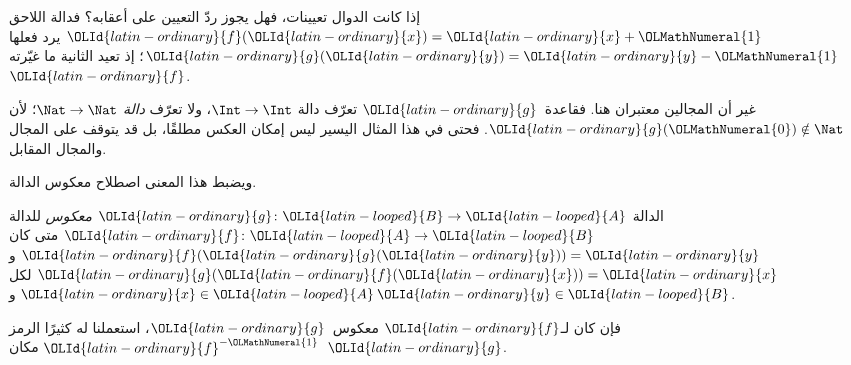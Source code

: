 \documentclass[../../../include/open-logic-section]{subfiles}
\begin{document}

\begin{explain}
إذا كانت الدوال تعيينات، فهل يجوز ردّ التعيين على أعقابه؟
فدالة اللاحق $\OLId{latin-ordinary}{f}(\OLId{latin-ordinary}{x}) = \OLId{latin-ordinary}{x} + \OLMathNumeral{1}$ يرد فعلها $\OLId{latin-ordinary}{g}(\OLId{latin-ordinary}{y}) = \OLId{latin-ordinary}{y} - \OLMathNumeral{1}$؛ إذ
تعيد الثانية ما غيّرته~$\OLId{latin-ordinary}{f}$.

غير أن المجالين معتبران هنا. فقاعدة~$\OLId{latin-ordinary}{g}$ تعرّف دالة
$\Int \to \Int$، ولا تعرّف \emph{دالة} $\Nat
\to \Nat$؛ لأن $\OLId{latin-ordinary}{g}(\OLMathNumeral{0}) \notin \Nat$. فحتى في هذا المثال اليسير
ليس إمكان العكس مطلقًا، بل قد يتوقف على المجال والمجال المقابل.

ويضبط هذا المعنى اصطلاح معكوس الدالة.
\end{explain}

\begin{defn}
الدالة $\OLId{latin-ordinary}{g} \colon \OLId{latin-looped}{B} \to \OLId{latin-looped}{A}$ \emph{معكوس} للدالة $\OLId{latin-ordinary}{f}
\colon \OLId{latin-looped}{A} \to \OLId{latin-looped}{B}$ متى كان $\OLId{latin-ordinary}{f}(\OLId{latin-ordinary}{g}(\OLId{latin-ordinary}{y})) = \OLId{latin-ordinary}{y}$ و$\OLId{latin-ordinary}{g}(\OLId{latin-ordinary}{f}(\OLId{latin-ordinary}{x})) = \OLId{latin-ordinary}{x}$ لكل
$\OLId{latin-ordinary}{x} \in \OLId{latin-looped}{A}$ و$\OLId{latin-ordinary}{y} \in \OLId{latin-looped}{B}$.
\end{defn}

فإن كان لـ$\OLId{latin-ordinary}{f}$ معكوس~$\OLId{latin-ordinary}{g}$، استعملنا له كثيرًا الرمز $\OLId{latin-ordinary}{f}^{-\OLMathNumeral{1}}$ مكان~$\OLId{latin-ordinary}{g}$.
\end{document}
